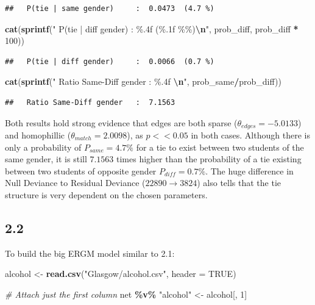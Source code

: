\documentclass[
]{article}
\newenvironment{Shaded}{\begin{snugshade}}{\end{snugshade}}
\newcommand{\AttributeTok}[1]{\textcolor[rgb]{0.13,0.29,0.53}{#1}}
\newcommand{\CommentTok}[1]{\textcolor[rgb]{0.56,0.35,0.01}{\textit{#1}}}
\newcommand{\ConstantTok}[1]{\textcolor[rgb]{0.56,0.35,0.01}{#1}}
\newcommand{\DecValTok}[1]{\textcolor[rgb]{0.00,0.00,0.81}{#1}}
\newcommand{\FunctionTok}[1]{\textcolor[rgb]{0.13,0.29,0.53}{\textbf{#1}}}
\newcommand{\NormalTok}[1]{#1}
\newcommand{\OtherTok}[1]{\textcolor[rgb]{0.56,0.35,0.01}{#1}}
\newcommand{\SpecialCharTok}[1]{\textcolor[rgb]{0.81,0.36,0.00}{\textbf{#1}}}
\newcommand{\StringTok}[1]{\textcolor[rgb]{0.31,0.60,0.02}{#1}}
\begin{document}
\begin{verbatim}
##   P(tie | same gender)     :  0.0473  (4.7 %)
\end{verbatim}

\begin{Shaded}
\begin{Highlighting}[]
\FunctionTok{cat}\NormalTok{(}\FunctionTok{sprintf}\NormalTok{(}\StringTok{"  P(tie | diff gender)     :  \%.4f  (\%.1f \%\%)}\SpecialCharTok{\textbackslash{}n}\StringTok{"}\NormalTok{, prob\_diff, prob\_diff }\SpecialCharTok{*} \DecValTok{100}\NormalTok{))}
\end{Highlighting}
\end{Shaded}

\begin{verbatim}
##   P(tie | diff gender)     :  0.0066  (0.7 %)
\end{verbatim}

\begin{Shaded}
\begin{Highlighting}[]
\FunctionTok{cat}\NormalTok{(}\FunctionTok{sprintf}\NormalTok{(}\StringTok{"  Ratio Same{-}Diff gender   :  \%.4f  }\SpecialCharTok{\textbackslash{}n}\StringTok{"}\NormalTok{, prob\_same}\SpecialCharTok{/}\NormalTok{prob\_diff))}
\end{Highlighting}
\end{Shaded}

\begin{verbatim}
##   Ratio Same-Diff gender   :  7.1563
\end{verbatim}

Both results hold strong evidence that edges are both sparse
(\(\theta_{edges}=-5.0133\)) and homophillic
(\(\theta_{match}=2.0098\)), as \(p << 0.05\) in both cases. Although
there is only a probability of \(P_{same}= 4.7\%\) for a tie to exist
between two students of the same gender, it is still \(7.1563\) times
higher than the probability of a tie existing between two students of
opposite gender \(P_{diff}=0.7\%\). The huge difference in Null Deviance
to Residual Deviance (\(22890 \rightarrow 3824\)) also tells that the
tie structure is very dependent on the chosen parameters.

\subsection{2.2}\label{section-3}

To build the big ERGM model similar to 2.1:

\begin{Shaded}
\begin{Highlighting}[]
\NormalTok{alcohol }\OtherTok{\textless{}{-}} \FunctionTok{read.csv}\NormalTok{(}\StringTok{"Glasgow/alcohol.csv"}\NormalTok{, }\AttributeTok{header =} \ConstantTok{TRUE}\NormalTok{)}

\CommentTok{\# Attach just the first column}
\NormalTok{net }\SpecialCharTok{\%v\%} \StringTok{"alcohol"} \OtherTok{\textless{}{-}}\NormalTok{ alcohol[, }\DecValTok{1}\NormalTok{]}
\end{Highlighting}
\end{Shaded}
\end{document}
